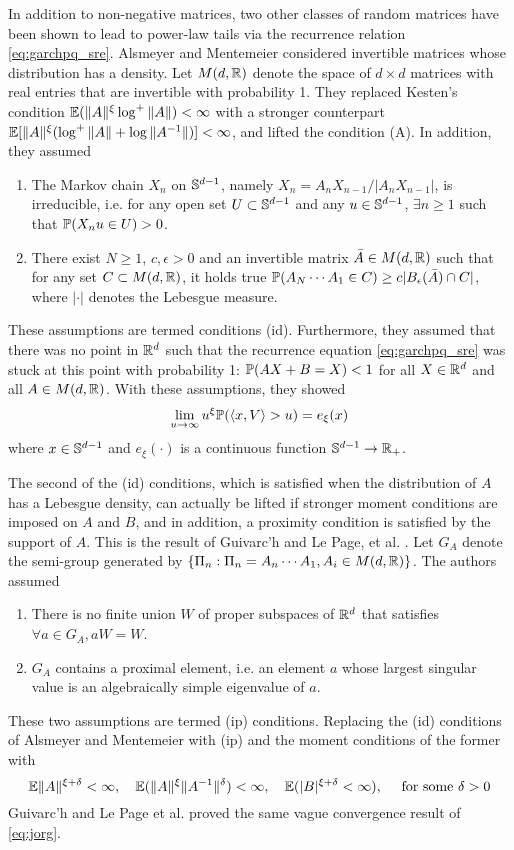 In addition to non-negative matrices, two other classes of random
matrices have been shown to lead to power-law tails via the recurrence
relation \eqref{eq:garchpq_sre}. Alsmeyer and Mentemeier
\cite{alsmeyer:mentemeier:2012} considered invertible matrices whose
distribution has a density. Let $M(d, \reals)$ denote the space of
$d \times d$ matrices with real entries that are invertible with
probability 1. They replaced Kesten's condition
$\E (\|A\|^\xi \log^+\|A\|) < \infty$ with a stronger
counterpart
$\E [\|A\|^\xi (\log^+\|A\| + \log \|A^{-1} \|)] < \infty$,
and lifted the condition (A). In addition, they assumed
\begin{enumerate}
  \item The Markov chain $X_n$ on $\sphere^{d-1}$, namely
    $X_n = A_n X_{n-1} / |A_n X_{n-1}|$, is irreducible, i.e. for any open
    set $U \subset \sphere^{d-1}$ and any $u \in \sphere^{d-1}$, 
    $\exists n \geq 1$ such that $\P(X_n u \in U) > 0$.
  \item There exist $N \geq 1$, $c, \epsilon > 0$ and an invertible
    matrix $\bar A \in M(d, \reals)$ such that for any set
    $C \subset M(d, \reals)$, it holds true
    $\P(A_N \cdots A_1 \in C) \geq c |B_\epsilon(\bar A) \cap C|$,
    where $|\cdot|$ denotes the Lebesgue measure.
\end{enumerate}
These assumptions are termed conditions (id). Furthermore, they assumed
that there was no point in $\reals^d$ such that the recurrence
equation \eqref{eq:garchpq_sre} was stuck at this point with probability 1: 
$\P(A X + B = X) < 1$ for all $X \in \reals^d$ and all $A \in M(d, \reals)$.
With these assumptions, they showed
\[
\lim_{u \to \infty} u^\xi \P(\inn{x, V} > u) = e_\xi(x)
\]
where $x \in \sphere^{d - 1}$ and $e_\xi(\cdot)$ is a continuous
function $\sphere^{d-1} \to \reals_+$.

The second of the (id) conditions, which is satisfied when the
distribution of $A$ has a Lebesgue density, can actually be lifted if
stronger moment conditions are imposed on $A$ and $B$, and in
addition, a proximity condition is satisfied by the support of
$A$. This is the result of Guivarc'h and Le Page, et al.
\cite{guivarc:page:2016}. Let $G_A$ denote the semi-group generated
by $\{\Pi_n: \Pi_n = A_n \cdots A_1, A_i \in M(d, \reals)\}$. The
authors assumed
\begin{enumerate}
  \item There is no finite union $W$ of proper subspaces of $\reals^d$
    that satisfies $\forall a \in G_A, a W = W$.
  \item $G_A$ contains a proximal element, i.e. an element $a$ whose
    largest singular value is an algebraically simple eigenvalue of $a$.
\end{enumerate}
These two assumptions are termed (ip) conditions. Replacing the (id)
conditions of Alsmeyer and Mentemeier with (ip) and the moment
conditions of the former with
\[
\E \|A\|^{\xi + \delta} < \infty, \quad
\E (\|A\|^{\xi} \|A^{-1}\|^{\delta}) < \infty, \quad
\E (|B|^{\xi + \delta} < \infty),\quad
\text{ for some }\delta > 0
\]
Guivarc'h and Le Page et al. proved the same vague convergence result
of \eqref{eq:jorg}.

